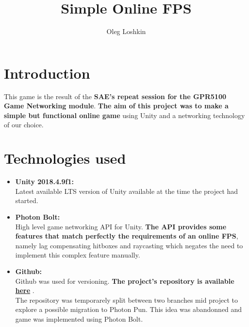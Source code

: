\documentclass[12pt,a4paper]{article}
\author{Oleg Loshkin}
\title{Simple Online FPS}
\begin{document}
\maketitle

\section{Introduction}
This game is the result of the \textbf{SAE's repeat session for the GPR5100 Game Networking module}. \textbf{The aim of this project was to make a simple but functional online game} using Unity and a networking technology of our choice.

\section{Technologies used}
\begin{itemize}
\item \textbf{Unity 2018.4.9f1:}\\
Latest available LTS version of Unity available at the time the project had started.
\item \textbf{Photon Bolt:}\\
High level game networking API for Unity. \textbf{The API provides some features that match perfectly the requirements of an online FPS}, namely lag compensating hitboxes and raycasting which negates the need to implement this complex feature manually.
\item \textbf{Github:}\\
Github was used for versioning. \textbf{The project's repository is available \href{https://github.com/LoshkinOleg/NetworkingRattrapage}{here}} .\\
The repository was temporarely split between two branches mid project to explore a possible migration to Photon Pun. This idea was abandonned and game was implemented using Photon Bolt.
\end{itemize}
\end{document}
